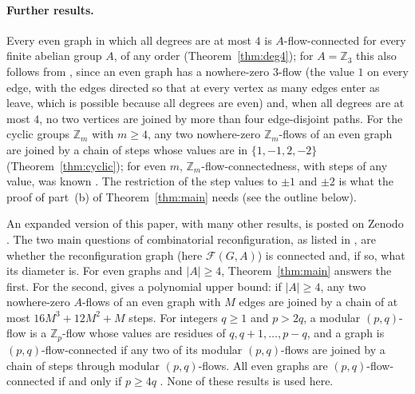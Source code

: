 \documentclass[11pt]{article}
\theoremstyle{definition}
\newcommand{\Z}{\mathbb{Z}}
\newcommand{\cF}{\mathcal{F}}
\begin{document}
\paragraph{Further results.} Every even graph in which all degrees are at most $4$ is $A$-flow-connected for every
finite abelian group $A$, of any order (Theorem~\ref{thm:deg4}); for $A=\Z_3$ this also follows from
\cite[Theorem~2.1]{CLSWX}, since an even graph has a nowhere-zero $3$-flow (the value $1$ on every edge, with the edges directed so
that at every vertex as many edges enter as leave, which is possible because all degrees are even) and, when all degrees are at most $4$, no two
vertices are joined by more than four edge-disjoint paths. For the cyclic groups $\Z_m$ with $m\ge 4$, any two nowhere-zero $\Z_m$-flows of an even graph are joined by a
chain of steps whose values are in $\{1,-1,2,-2\}$ (Theorem~\ref{thm:cyclic}); for even $m$, $\Z_m$-flow-connectedness, with steps of any value,
was known \cite[Theorem~4.3]{CLSWX}. The restriction of the step values to $\pm1$ and $\pm2$ is what the proof of
part~(b) of Theorem~\ref{thm:main} needs (see the outline below).

An expanded version of this paper, with many other results, is posted on Zenodo \cite{G}.
The two main questions of combinatorial reconfiguration, as listed in \cite[Section~1]{EHLMNS}, are whether the
reconfiguration graph (here $\cF(G,A)$) is connected and, if so, what its diameter is. For even graphs and $|A|\ge 4$,
Theorem~\ref{thm:main} answers the first. For the second, \cite[Theorem~2.5]{G} gives a polynomial upper bound: if $|A|\ge 4$, any two
nowhere-zero $A$-flows of an even graph with $M$ edges are joined by a chain of at most $16M^3+12M^2+M$ steps. For
integers $q\ge 1$ and $p>2q$, a modular $(p,q)$-flow \cite[Section~2]{CLSWX} is a $\Z_p$-flow whose values are residues
of $q,q+1,\dots,p-q$, and a graph is $(p,q)$-flow-connected if any two of its modular $(p,q)$-flows are joined by a
chain of steps through modular $(p,q)$-flows. All even graphs are $(p,q)$-flow-connected if and only if $p\ge 4q$
\cite[Theorems~9.1~and~9.2]{G}. None of these results is used here.
\end{document}
